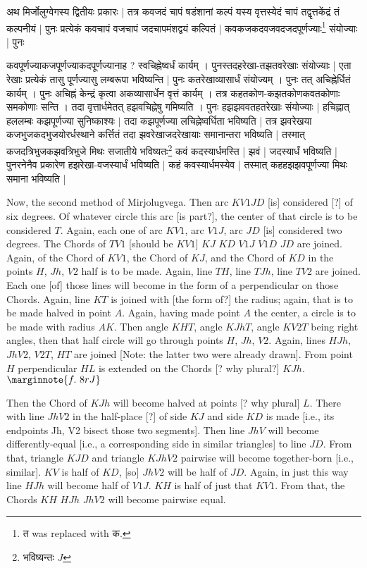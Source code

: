 \documentclass[12pt]{book}
\begin{document}
{\s अथ मिर्जोलुग्वेगस्य द्वितीयः प्रकारः | तत्र कवजदं चापं षडंशानां कल्पं
यस्य वृत्तस्येदं चापं तद्वृत्तकेंद्रं तं कल्पनीयं | पुनः प्रत्येकं कवचापं वजचापं जदचापमंशद्वयं कल्पितं |
कवकजकदवजवदजदपूर्णज्याः\footnote{{\s त} was replaced with {\s क}.} संयोज्याः | पुनः 

कवपूर्णज्याकजपूर्णज्याकदपूर्णज्यानाह ?
स्वचिह्नेष्वर्धं कार्यम् । पुनस्तदहरेखा-तझतवरेखाः संयोज्याः | एता रेखाः प्रत्येकं तासु पूर्णज्यासु लम्बरूपा भविष्यन्ति | पुनः कतरेखाव्यासार्धं संयोज्यम् । पुनः तत् अचिह्नेर्धितं कार्यम् । पुनः अचिह्नं केन्द्रं कृत्वा
अकव्यासार्धेन वृत्तं कार्यम् । तत्र कहतकोण-कझतकोणकवतकोणाः समकोणाः सन्ति । तदा वृत्तार्धमेतत् हझवचिह्नेषु गमिष्यति । पुनः हझझववतहतरेखाः संयोज्याः | हचिह्नात् हललम्बः कझपूर्णज्या सुनिष्काश्यः $|$
तदा कझपूर्णज्या लचिह्नेष्वर्धिता भविष्यति | तत्र झवरेखया कजभुजकदभुजयोरर्धस्थाने कर्त्तितं तदा झवरेखा\-जदरेखायाः समानान्तरा भविष्यति | तस्मात् कजदत्रिभुजकझवत्रिभुजे मिथः सजातीये भविष्यतः\footnote{{\s भविष्यन्तः} $J$} कवं कदस्यार्धमस्ति | झवं | जदस्यार्धं भविष्यति |
पुनरनेनैव प्रकारेण हझरेखा-वजस्यार्धं भविष्यति | कहं कवस्यार्धमस्येव | तस्मात् कहहझझवपूर्णज्या मिथः समाना भविष्यति |}  

\newpage

Now, the second method of Mirjolugvega. Then arc $KV1JD$ [is] considered [?] of six degrees.
Of whatever circle this arc [is part?], the center of that circle is to be considered $T$. Again, 
each one of arc $KV1$, arc $V1J$, arc $JD$ [is] considered two degrees. The Chords
of $TV1$ [should be $KV1$] $KJ$ $KD$ $V1J$ $V1D$ $JD$ are joined. Again, of the Chord of $KV1$,
the Chord of $KJ$, and the Chord of $KD$ in the points $H$, $Jh$, $V2$ half  is to be made.
Again, line $TH$, line $TJh$, line $TV2$ are  joined. Each one [of] those lines 
will become in the form of a perpendicular on those Chords. 
Again, line $KT$ is joined with [the form of?] the radius; again, that is to be made halved
in point $A$. Again, having made point $A$ the center, a circle is to be made with
radius $AK$. Then angle $KHT$, angle $KJhT$, angle $KV2T$ being right angles, 
then  that half circle will go through points $H$, $Jh$, $V2$. 
Again, lines $HJh$, $JhV2$, $V2T$, $HT$ are joined [Note: the latter two were already
drawn]. From 
point $H$ perpendicular $HL$ is extended on the Chords [? why plural?] $KJh$. 
$\marginnote{f.~8r J}$

Then the Chord of $KJh$ will become halved at points [? why plural] $L$. There with line $JhV2$ 
in the half-place [?] of side $KJ$ and side $KD$ is made [i.e., its endpoints Jh, V2 bisect those 
two segments]. Then line $JhV$ will
become differently-equal [i.e., a corresponding side in similar triangles]
to line $JD$. From that, triangle $KJD$ and triangle
$KJhV2$ pairwise will become together-born [i.e., similar]. 
$KV$ is half of $KD$, [so] $JhV2$ will be half of $JD$.
Again, in just this way line $HJh$ will become half of $V1 J$. $KH$ is half of just that $KV1$.
From that, the Chords $KH$ $HJh$ $JhV2$ will become pairwise equal. 
\end{document}
